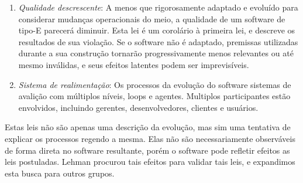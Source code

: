 \begin{enumerate}
	\item \textit{Qualidade descrescente}: A menos que rigorosamente adaptado e evoluído para considerar mudanças operacionais do meio, a qualidade de um software de tipo-E parecerá diminuir. Esta lei é um corolário à primeira lei, e descreve os resultados de sua violação. Se o software não é adaptado, premissas utilizadas durante a sua construção tornarão progressivamente menos relevantes ou até mesmo inválidas, e seus efeitos latentes podem ser imprevisíveis.
	\item \textit{Sistema de realimentação}: Os processos da evolução do software sistemas de avalição com múltiplos níveis, loops e agentes. Multiplos participantes estão envolvidos, incluindo gerentes, desenvolvedores, clientes e usuários. 
\end{enumerate}

Estas leis não são apenas uma descrição da evolução, mas sim uma tentativa de explicar os processos regendo a mesma. Elas não são necessariamente observáveis de forma direta no software resultante, porém o software pode refletir efeitos as leis postuladas. Lehman procurou tais efeitos para validar tais leis, e expandimos esta busca para outros grupos.

